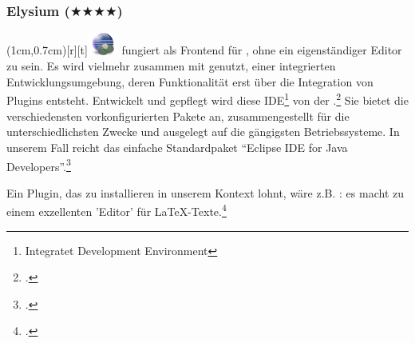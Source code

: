%
%
%



\subsubsection{Elysium ($\bigstar\bigstar\bigstar\bigstar$)}

\parpic(1cm,0.7cm)[r][t]{\includegraphics[width=1cm]{logos/elysium-300dpi.png}}
\label{Elysium} fungiert als Frontend für , ohne ein
eigenständiger Editor zu sein. Es wird vielmehr zusammen mit 
genutzt, einer integrierten Entwicklungsumgebung, deren Funktionalität erst über
die Integration von Plugins entsteht. Entwickelt und gepflegt wird diese
IDE\footnote{Integratet Development Environment} von der .\footcite[vgl.][\nopage wp]{Eclipse2018a} Sie bietet die
verschiedensten vorkonfigurierten Pakete an, zusammengestellt für die
unterschiedlichsten Zwecke und ausgelegt auf die gängigsten Betriebssysteme. In
unserem Fall reicht das einfache Standardpaket \enquote{Eclipse IDE for Java
Developers}.\footcite[vgl.][\nopage wp]{Eclipse2018b}

Ein Plugin, das zu installieren in unserem Kontext lohnt, wäre z.B.
: es macht  zu einem exzellenten 'Editor' für
\LaTeX-Texte.\footcite[vgl.][\nopage wp]{TeXlipse2019a}

